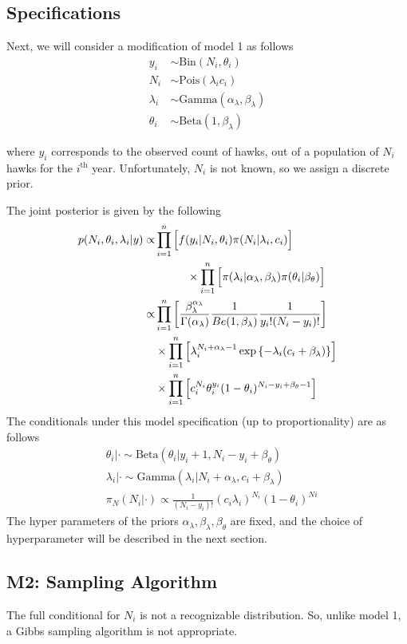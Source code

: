 \documentclass{asaproc}
\newcommand{\prodi}{\prod_{i=1}^n}
\newcommand{\yi}{y_i}
\newcommand{\squarebk}[1]{\left[#1\right]}
\newcommand{\parenth}[1]{\left(#1\right)}
\newcommand\tab[1][1cm]{\hspace*{#1}}
\newcommand{\Pois}{\text{Pois}}
\newcommand{\Gam}{\text{Gamma}}
\newcommand{\Bin}{\text{Bin}}
\newcommand{\alplam}{\alpha_\lambda}
\newcommand{\betlam}{\beta_\lambda}
\newcommand{\betthet}{\beta_\theta}
\newcommand{\lami}{\lambda_i}
\newcommand{\theti}{\theta_i}
\newcommand{\ci}{c_i}
\newcommand{\Ni}{N_i}
\newcommand{\Bet}{\text{Beta}}
\begin{document}
\subsection{Specifications}
Next, we will consider a modification of model 1 as follows
\begin{align*}
    y_i &\sim \Bin(N_i,\theta_i)\\
    N_i &\sim \Pois(\lambda_i c_i)\\
    \lambda_i &\sim \Gam(\alplam,\betlam)\\
    \theta_i &\sim \Bet(1, \betlam)
\end{align*}

where $y_i$ corresponds to the observed count of hawks, out of a population of $N_i$ hawks for the $i^\text{th}$ year. Unfortunately, $N_i$ is not known, so we assign a discrete prior. 

The joint posterior is given by the following
\begin{align*}
    p(\Ni, \theti, \lami| y) \propto& \prodi \Big[ f(y_i|\Ni,\theti) \pi(\Ni|\lami, \ci)\Big]\\
    & \tab \times \prodi \Big[ \pi(\lami|\alplam, \betlam) \pi(\theti|\betthet) \Big]\\
    \propto& \prodi \left[ \frac{\betlam^{\alplam}}{\Gamma(\alplam)} \frac{1}{Be(1,\betlam)} \frac{1}{y_i! (\Ni - y_i)!} \right]\\
    &\times \prodi \left[ \lami^{\Ni + \alplam - 1} \exp\left\{-\lami(\ci + \betlam) \right\} \right]\\
    &\times \prodi \squarebk{\ci^{\Ni} \theti^{y_i}(1-\theti)^{\Ni - \yi + \betthet-1}}
\end{align*}
The conditionals under this model specification (up to proportionality) are as follows
\begin{align*}
    &\theti | \cdot \sim \Bet \parenth{\theti\Big| \yi + 1, \Ni - \yi +\betthet}\\
    &\lami|\cdot \sim \Gam\parenth{\lami \Big| \Ni + \alplam, \ci + \betlam}\\
    &\pi_N(\Ni|\cdot) \propto \frac{1}{(\Ni - \yi)!} (\ci\lami)^{\Ni}(1-\theti)^{Ni}
\end{align*}
The hyper parameters of the priors $\alplam, \betlam, \betthet$ are fixed, and the choice of hyperparameter will be described in the next section.

\subsection{M2: Sampling Algorithm}
The full conditional for $\Ni$ is not a recognizable distribution. So, unlike model 1, a Gibbs sampling algorithm is not appropriate. 
\end{document}
